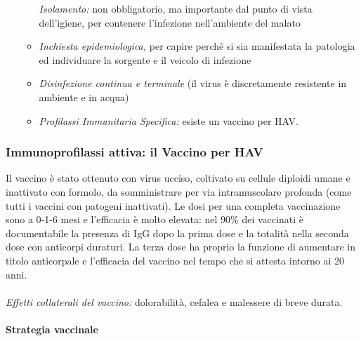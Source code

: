 \begin{enumerate}
\begin{itemize}
  \emph{Isolamento:} non obbligatorio, ma importante dal punto di vista
  dell'igiene, per contenere l'infezione nell'ambiente del malato
   
\item
   
  \emph{Inchiesta epidemiologica,} per capire perché si sia manifestata
  la patologia ed individuare la sorgente e il veicolo di infezione
   
\item
   
  \emph{Disinfezione continua e terminale} (il virus è discretamente
  resistente in ambiente e in acqua)
   
\item
   
  \emph{Profilassi Immunitaria Specifica:} esiste un vaccino per HAV.
   
\end{itemize}
\end{enumerate}
\subsubsection{Immunoprofilassi attiva: il Vaccino per HAV}


Il vaccino è stato ottenuto con virus ucciso, coltivato su cellule
diploidi umane e inattivato con formolo, da somministrare per via
intramuscolare profonda (come tutti i vaccini con patogeni inattivati).
Le dosi per una completa vaccinazione sono a 0-1-6 mesi e l'efficacia è
molto elevata: nel 90\% dei vaccinati è documentabile la presenza di IgG
dopo la prima dose e la totalità nella seconda dose con anticorpi
duraturi. La terza dose ha proprio la funzione di aumentare in titolo
anticorpale e l'efficacia del vaccino nel tempo che si attesta intorno
ai 20 anni.
\\\\
\emph{Effetti collaterali del vaccino:} dolorabilità, cefalea e
malessere di breve durata.

\paragraph{Strategia vaccinale}


